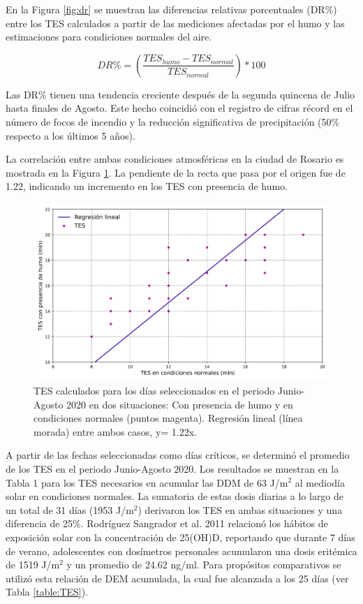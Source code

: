 En la Figura \ref{fig:dr} se muestran las diferencias relativas porcentuales (DR\%) entre los TES calculados a partir de las mediciones afectadas por el humo y las estimaciones para condiciones normales del aire.

\begin{equation*}
    DR\% = \left(\frac{TES_{humo}-TES_{normal}}{TES_{normal}}\right)*100
\end{equation*}

Las DR\% tienen una tendencia creciente después de la segunda quincena de Julio hasta finales de Agosto. Este hecho coincidió con el registro de cifras récord en el número de focos de incendio y la reducción significativa de precipitación (50\% respecto a los últimos 5 años).

La correlación entre ambas condiciones atmosféricas en la ciudad de Rosario es mostrada en la Figura \ref{fig:regresion_lineal}. La pendiente de la recta que pasa por el origen fue de 1.22, indicando un incremento en los TES con presencia de humo.

\begin{figure}[H]
    \centering
    \includegraphics[width=12cm]{Graphics/image9.png}
    \caption{TES calculados  para los días seleccionados en el periodo Junio-Agosto 2020 en dos situaciones: Con presencia de humo y en condiciones normales (puntos magenta). Regresión lineal (línea morada) entre ambos casos, y= 1.22x.}
    \label{fig:regresion_lineal}
\end{figure}

A partir de las fechas seleccionadas como días críticos, se determinó el promedio de los TES en el periodo Junio-Agosto 2020. Los resultados se muestran en la Tabla 1 para los TES necesarios en acumular las DDM de 63 J/m$^2$ al mediodía solar en condiciones normales. La sumatoria de estas dosis diarias a lo largo de un total de 31 días (1953 J/m$^2$) derivaron los TES en ambas situaciones y una diferencia de 25\%. Rodríguez Sangrador et al. 2011\cite{Rodriguez_2011} relacionó los hábitos de exposición solar con la concentración de 25(OH)D, reportando que durante 7 días de verano, adolescentes con dosímetros personales acumularon una dosis eritémica de 1519 J/m$^2$ y un promedio de 24.62 ng/ml. Para propósitos comparativos se utilizó esta relación de DEM acumulada, la cual fue alcanzada a los 25 días (ver Tabla \ref{table:TES}).

